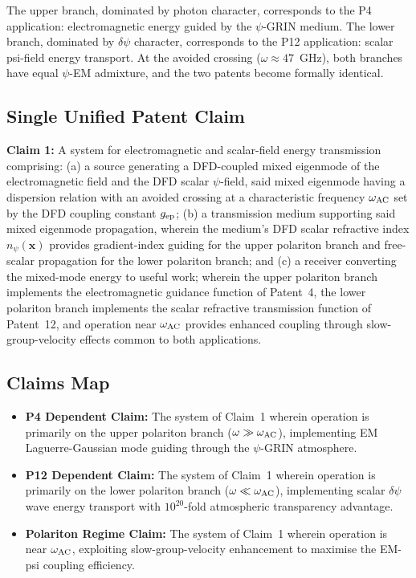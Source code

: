 \documentclass[aps,prd,twocolumn,superscriptaddress]{revtex4-2}
\newcommand{\npsi}{n_\psi}
\begin{document}
The upper branch, dominated by photon character, corresponds to the
P4 application: electromagnetic energy guided by the $\psi$-GRIN
medium.  The lower branch, dominated by $\delta\psi$ character,
corresponds to the P12 application: scalar psi-field energy transport.
At the avoided crossing ($\omega \approx 47$~GHz), both branches have
equal $\psi$-EM admixture, and the two patents become formally identical.

\subsection{Single Unified Patent Claim}

\begin{tcolorbox}[title=Unified P4+P12 Patent Claim Draft]
\textbf{Claim 1:} A system for electromagnetic and scalar-field energy
transmission comprising: (a) a source generating a DFD-coupled mixed
eigenmode of the electromagnetic field and the DFD scalar $\psi$-field,
said mixed eigenmode having a dispersion relation with an avoided
crossing at a characteristic frequency $\omega_{\rm AC}$ set by the
DFD coupling constant $g_{\rm ep}$; (b) a transmission medium supporting
said mixed eigenmode propagation, wherein the medium's DFD scalar
refractive index $\npsi(\mathbf{x})$ provides gradient-index guiding
for the upper polariton branch and free-scalar propagation for the lower
polariton branch; and (c) a receiver converting the mixed-mode energy
to useful work; wherein the upper polariton branch implements the
electromagnetic guidance function of Patent~4, the lower polariton
branch implements the scalar refractive transmission function of
Patent~12, and operation near $\omega_{\rm AC}$ provides enhanced
coupling through slow-group-velocity effects common to both
applications.
\end{tcolorbox}

\subsection{Claims Map}

\begin{itemize}
  \item \textbf{P4 Dependent Claim:} The system of Claim~1 wherein operation
    is primarily on the upper polariton branch ($\omega \gg \omega_{\rm AC}$),
    implementing EM Laguerre-Gaussian mode guiding through the
    $\psi$-GRIN atmosphere.
  \item \textbf{P12 Dependent Claim:} The system of Claim~1 wherein operation
    is primarily on the lower polariton branch ($\omega \ll \omega_{\rm AC}$),
    implementing scalar $\delta\psi$ wave energy transport with
    $10^{20}$-fold atmospheric transparency advantage.
  \item \textbf{Polariton Regime Claim:} The system of Claim~1 wherein
    operation is near $\omega_{\rm AC}$, exploiting slow-group-velocity
    enhancement to maximise the EM-psi coupling efficiency.
\end{itemize}
\end{document}
